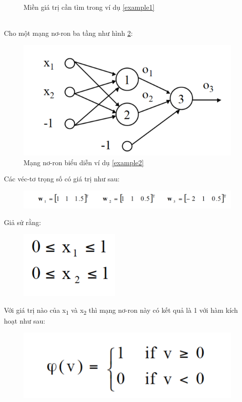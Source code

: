 \begin{answ}
\begin{figure}[h]
		\centering
	\caption{Miền giá trị cần tìm trong ví dụ \ref{example1}}
	\label{fig:example1graph}
\end{figure}
\end{answ}

\begin{exmp}
\label{example2}
\hrulefill\\
Cho một mạng nơ-ron ba tầng như hình \ref{fig:Example2graph}:

\begin{figure}[h]
	\centering
		\includegraphics[width=0.7\columnwidth]{chapter01/figure/example 2.png}
		\centering
	\caption{Mạng nơ-ron biểu diễn ví dụ \ref{example2}}
	\label{fig:Example2graph}
\end{figure}

\noindent Các véc-tơ trọng số có giá trị như sau:

\begin{figure}[h]
\includegraphics[width=1\columnwidth]{chapter01/figure/example 2-weight .png}
\end{figure}

\noindent Giả sử rằng:

\begin{figure}[!h]
\includegraphics[width=0.2\columnwidth]{chapter01/figure/example 2-assume.png}
\end{figure}

\noindent Với giá trị nào của x\textsubscript{1} và x\textsubscript{2} thì mạng nơ-ron này có kết quả là 1 với hàm kích hoạt như sau:
\begin{figure}[!h]
\includegraphics[width=0.4\columnwidth]{chapter01/figure/example 2-activation.png}
\end{figure}
\end{exmp}

